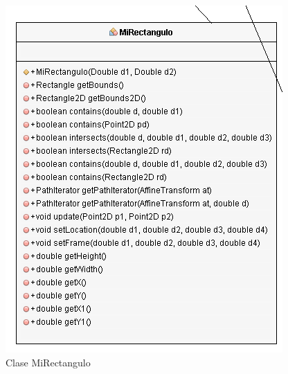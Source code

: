 \begin{figure}[H]
  \centering
    \includegraphics[scale=0.55]{images/mirectangulo2}
  \caption{Clase MiRectangulo}
  \label{Clases MiRectangulo}
\end{figure}
